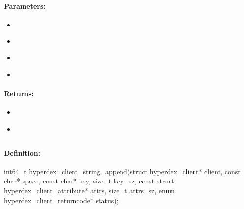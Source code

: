 \paragraph{Parameters:}
\begin{itemize}[noitemsep]
\item {}\\

\item {}\\

\item {}\\

\item {}\\

\end{itemize}

\paragraph{Returns:}
\begin{itemize}[noitemsep]
\item {}\\

\item {}\\

\end{itemize}

\pagebreak
\subsection{}
\label{api:c:string_append}


\paragraph{Definition:}
\begin{ccode}
int64_t hyperdex_client_string_append(struct hyperdex_client* client,
        const char* space,
        const char* key, size_t key_sz,
        const struct hyperdex_client_attribute* attrs, size_t attrs_sz,
        enum hyperdex_client_returncode* status);
\end{ccode}

